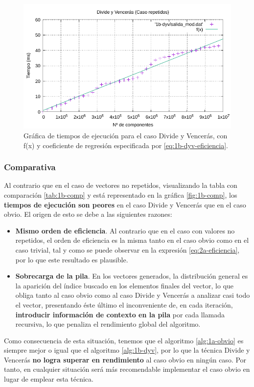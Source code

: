 \begin{figure}[h]
    \centering
    \includegraphics[scale=0.76]{img/e1b-dyv}
    \caption{Gráfica de tiempos de ejecución para el caso Divide y Vencerás, 
    con f(x) y coeficiente de regresión especificada por \ref{eq:1b-dyv-eficiencia}.}
    \label{fig:1b-dyv-graph}
\end{figure}

\subsubsection{Comparativa} \label{sec:1b-comp}

Al contrario que en el caso de vectores no repetidos, visualizando la tabla
con comparación \ref{tab:1b-comp} y está representado en la gráfica \ref{fig:1b-comp}, 
los \textbf{tiempos 
de ejecución son peores} en el caso Divide y
Vencerás que en el caso obvio. El origen de esto se debe a las siguientes
razones:

\begin{itemize}
    \item \textbf{Mismo orden de eficiencia}. Al contrario que en el caso con valores 
    no repetidos, el orden de eficiencia
    es la misma tanto en el caso obvio como en el caso trivial, tal y como se puede
    observar en la expresión \ref{eq:2a-eficiencia}, por lo que este resultado es plausible. 
    \item \textbf{Sobrecarga de la pila}. En los vectores generados, la distribución 
    general es la aparición del índice
    buscado en los elementos finales del vector, lo que obliga tanto al caso obvio como al caso
    Divide y Vencerás a analizar casi todo el vector, presentando éste último el 
    inconveniente de, en cada iteración, \textbf{introducir información de contexto
    en la pila} por cada llamada recursiva, lo que penaliza el rendimiento global del
    algoritmo. 
\end{itemize}

Como consecuencia de esta situación, tenemos que el algoritmo \ref{alg:1a-obvio} es siempre mejor o igual 
que el algoritmo \ref{alg:1b-dyv}, por lo que la técnica Divide y Vencerás \textbf{no logra superar en 
rendimiento} al caso obvio en ningún caso. Por tanto, en cualquier situación será más recomendable
implementar el caso obvio en lugar de emplear esta técnica. 
